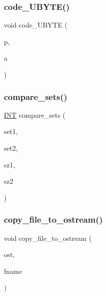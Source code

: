 \mbox{\label{util_8_c_ab19ac74b5d294f8f631cf9280c38dfd6}} 
\subsubsection{\texorpdfstring{code\+\_\+\+U\+B\+Y\+T\+E()}{code\_UBYTE()}}
{\footnotesize\ttfamily void code\+\_\+\+U\+B\+Y\+TE (\begin{DoxyParamCaption}\item[{char $\ast$\&}]{p,  }\item[{\mbox{\hyperlink{galois_8h_a122c4acf389c050379f00341fdcd5812}{U\+B\+Y\+TE}}}]{a }\end{DoxyParamCaption})}

\mbox{\label{util_8_c_a1866fcbe37260524bd1ba65377e35552}} 
\subsubsection{\texorpdfstring{compare\+\_\+sets()}{compare\_sets()}}
{\footnotesize\ttfamily \mbox{\hyperlink{galois_8h_a09fddde158a3a20bd2dcadb609de11dc}{I\+NT}} compare\+\_\+sets (\begin{DoxyParamCaption}\item[{\mbox{\hyperlink{galois_8h_a09fddde158a3a20bd2dcadb609de11dc}{I\+NT}} $\ast$}]{set1,  }\item[{\mbox{\hyperlink{galois_8h_a09fddde158a3a20bd2dcadb609de11dc}{I\+NT}} $\ast$}]{set2,  }\item[{\mbox{\hyperlink{galois_8h_a09fddde158a3a20bd2dcadb609de11dc}{I\+NT}}}]{sz1,  }\item[{\mbox{\hyperlink{galois_8h_a09fddde158a3a20bd2dcadb609de11dc}{I\+NT}}}]{sz2 }\end{DoxyParamCaption})}

\mbox{\label{util_8_c_a468782dfbc72bc98cfbc6b00ff8a6ba6}} 
\subsubsection{\texorpdfstring{copy\+\_\+file\+\_\+to\+\_\+ostream()}{copy\_file\_to\_ostream()}}
{\footnotesize\ttfamily void copy\+\_\+file\+\_\+to\+\_\+ostream (\begin{DoxyParamCaption}\item[{ostream \&}]{ost,  }\item[{\mbox{\hyperlink{galois_8h_ab6cc7b4aeb6ea31aba2b3fbfc83ff5e6}{B\+Y\+TE}} $\ast$}]{fname }\end{DoxyParamCaption})}

